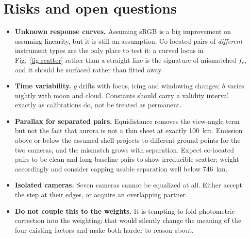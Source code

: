 \documentclass[11pt,a4paper]{article}
\newcommand{\gain}{g}
\newcommand{\off}{b}
\begin{document}
\section{Risks and open questions}

\begin{itemize}
  \item \textbf{Unknown response curves.} Assuming sRGB is a big improvement on
    assuming linearity, but it is still an assumption. Co-located pairs of
    \emph{different} instrument types are the only place to test it: a curved
    locus in Fig.~\ref{fig:scatter} rather than a straight line is the signature
    of mismatched $f_c$, and it should be surfaced rather than fitted away.
  \item \textbf{Time variability.} $\gain$ drifts with focus, icing and
    windowing changes; $\off$ varies nightly with moon and cloud. Constants
    should carry a validity interval exactly as calibrations do, not be treated
    as permanent.
  \item \textbf{Parallax for separated pairs.} Equidistance removes the
    view-angle term but not the fact that aurora is not a thin sheet at exactly
    \SI{100}{km}. Emission above or below the assumed shell projects to
    different ground points for the two cameras, and the mismatch grows with
    separation. Expect co-located pairs to be clean and long-baseline pairs to
    show irreducible scatter; weight accordingly and consider capping usable
    separation well below \SI{746}{km}.
  \item \textbf{Isolated cameras.} Seven cameras cannot be equalized at all.
    Either accept the step at their edges, or acquire an overlapping partner.
  \item \textbf{Do not couple this to the weights.} It is tempting to fold
    photometric correction into the weighting; that would silently change the
    meaning of the four existing factors and make both harder to reason about.
\end{itemize}
\end{document}
